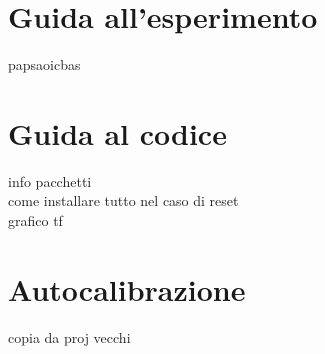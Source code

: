 \section{Guida all'esperimento}
papsaoicbas \\
\section{Guida al codice}
info pacchetti \\
come installare tutto nel caso di reset \\
grafico tf


\appendix
\section{Autocalibrazione}
copia da proj vecchi



\newpage



